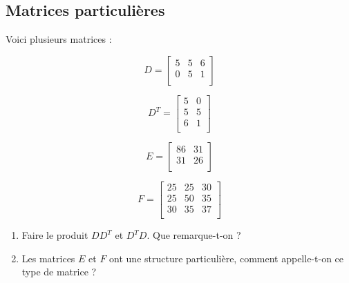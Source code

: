 \documentclass[a4paper]{article}\usepackage[]{graphicx}\usepackage[]{xcolor}
\begin{document}
\subsection*{Matrices particulières}



Voici plusieurs matrices :

\begin{minipage}{0.25\linewidth}
    \begin{equation*}
        D = \begin{bmatrix} 5 &5 &6 \\0 &5 &1 \\ \end{bmatrix}
    \end{equation*}
\end{minipage}
\begin{minipage}{0.25\linewidth}
    \begin{equation*}
        D^T = \begin{bmatrix} 5 &0 \\5 &5 \\6 &1 \\ \end{bmatrix}
    \end{equation*}
\end{minipage}
\begin{minipage}{0.25\linewidth}
    \begin{equation*}
        E = \begin{bmatrix} 86 &31 \\31 &26 \\ \end{bmatrix}
    \end{equation*}
\end{minipage}
\begin{minipage}{0.25\linewidth}
    \begin{equation*}
        F = \begin{bmatrix} 25 &25 &30 \\25 &50 &35 \\30 &35 &37 \\ \end{bmatrix}
    \end{equation*}
\end{minipage}

\begin{enumerate}
    \item Faire le produit $DD^T$ et $D^TD$. Que remarque-t-on ?
    \item Les matrices $E$ et $F$ ont une structure particulière, comment 
    appelle-t-on ce type de matrice ?
\end{enumerate}
\end{document}
